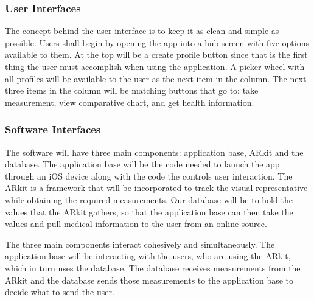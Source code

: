 \documentclass[letterpaper,10pt,draftclsnofoot,onecolumn,compsoc]{IEEEtran}
\begin{document}
\subsubsection{User Interfaces}
\begin{singlespace}
\noindent
The concept behind the user interface is to keep it as clean and simple as possible. Users shall begin by opening the app into a hub screen with five options available to them. At the top will be a create profile button since that is the first thing the user must accomplish when using the application. A picker wheel with all profiles will be available to the user as the next item in the column. The next three items in the column will be matching buttons that go to: take measurement, view comparative chart, and get health information.\\
\end{singlespace}

\subsubsection{Software Interfaces}
\begin{singlespace}
\noindent
The software will have three main components: application base, ARkit and the database. The application base will be the code needed to launch the app through an iOS device along with the code the controls user interaction. The ARkit is a framework that will be incorporated to track the visual representative while obtaining the required measurements. Our database will be to hold the values that the ARkit gathers, so that the application base can then take the values and pull medical information to the user from an online source.\\ \par

The three main components interact cohesively and simultaneously. The application base will be interacting with the users, who are using the ARkit, which in turn uses the database. The database receives measurements from the ARkit and the database sends those measurements to the application base to decide what to send the user.
\end{singlespace}
\end{document}
